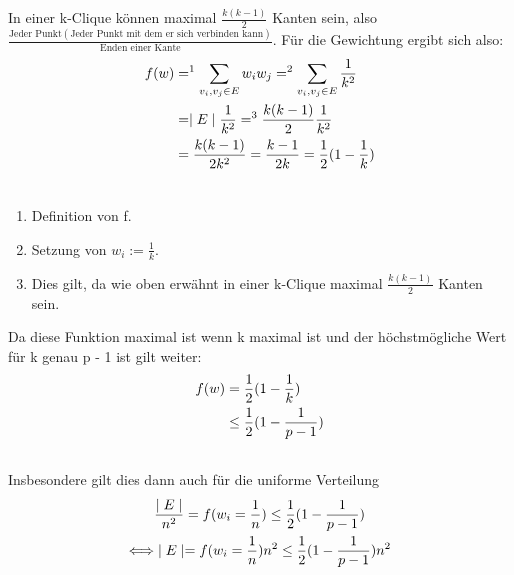 \documentclass[12pt, a4paper]{article}
\begin{document}
In einer k-Clique können maximal $\frac{k (k-1)}{2}$ Kanten sein, also $\frac{\text{Jeder Punkt} (\text{Jeder Punkt mit dem er sich verbinden kann})}{\text{Enden einer Kante}}$. Für die Gewichtung ergibt sich also:
\begin{gather}
\begin{split}f(w) &=^1 \sum_{v_i, v_j \in E} w_i w_j =^2 \sum_{v_i, v_j \in E} \frac{1}{k^2}  \\
&= \mid E \mid \frac{1}{k^2} =^3 \frac{k (k-1)}{2} \frac{1}{k^2}  \\
&= \frac{k (k-1)}{2k^2} = \frac{k-1}{2k} = \frac{1}{2} (1 - \frac{1}{k})\end{split}\notag\\\begin{split}\end{split}\notag
\end{gather}\begin{enumerate}
\item {}
Definition von f.

\item {}
Setzung von $w_i := \frac{1}{k}$.

\item {}
Dies gilt, da wie oben erwähnt in einer k-Clique maximal $\frac{k (k-1)}{2}$ Kanten sein.

\end{enumerate}

Da diese Funktion maximal ist wenn k maximal ist und der höchstmögliche Wert für k genau p - 1 ist gilt weiter:
\begin{gather}
\begin{split}f(w) &= \frac{1}{2} (1 - \frac{1}{k}) \\
&\le \frac{1}{2} (1 - \frac{1}{p-1})\end{split}\notag\\\begin{split}\end{split}\notag
\end{gather}
Insbesondere gilt dies dann auch für die uniforme Verteilung
\begin{gather}
\begin{split}&\frac{\mid E \mid}{n^2} = f(w_i = \frac{1}{n}) \le \frac{1}{2} (1 - \frac{1}{p-1}) \\
\Longleftrightarrow &\mid E \mid = f(w_i = \frac{1}{n})  n^2 \le \frac{1}{2} (1 - \frac{1}{p-1})  n^2\end{split}\notag\\\begin{split}\end{split}\notag
\end{gather}
\end{document}
